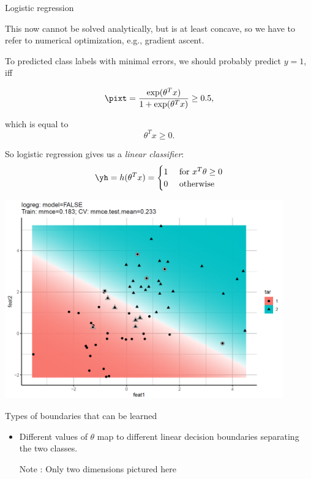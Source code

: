 \begin{vbframe}{Logistic regression}

This now cannot be solved analytically, but is at least concave, so we have to refer to numerical optimization, e.g., gradient ascent.

\lz

To predicted class labels with minimal errors, we should probably predict $y=1$, iff

$$
\pixt = \frac{\exp(\theta^T x)}{1+\exp(\theta^Tx)} \ge 0.5,
$$

which is equal to
$$
\theta^T x \ge 0.
$$

So logistic regression gives us a \emph{linear classifier}:
$$
\yh = h(\theta^T x) =
\begin{cases}
1 & \text{ for } x^T\theta \ge 0 \\
0 & \text{ otherwise}
\end{cases}
$$


\framebreak

\begin{center}
\includegraphics[width=0.9\textwidth]{plots/logistic-reg.png}
\end{center}

\end{vbframe}

\begin{frame} {Types of boundaries that can be learned}
  \begin{itemize}
    \item Different values of $\theta$ map to different linear decision boundaries separating the two classes.
    \vspace{5mm}
    \begin{figure}
    \centering
  \end{figure}
    \vspace{5mm}
  Note : Only two dimensions pictured here
  \end{itemize}
\end{frame}

